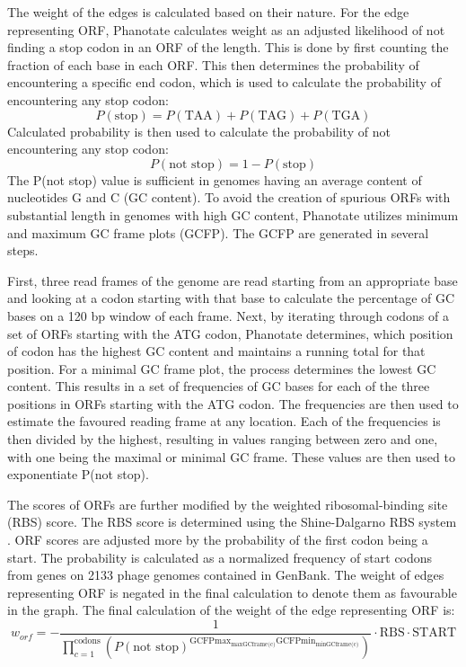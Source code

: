 The weight of the edges is calculated based on their nature. For the edge representing ORF, Phanotate calculates weight as an adjusted likelihood of not finding a stop codon in an ORF of the length. This is done by first counting the fraction of each base in each ORF. This then determines the probability of encountering a specific end codon, which is used to calculate the probability of encountering any stop codon:
\[ P(\text{stop}) = P(\text{TAA}) + P(\text{TAG}) + P(\text{TGA}) \]
Calculated probability is then used to calculate the probability of not encountering any stop codon:
\[ P(\text{not stop}) = 1 - P(\text{stop}) \]
The P(not stop) value is sufficient in genomes having an average content of nucleotides G and C (GC content). To avoid the creation of spurious ORFs with substantial length in genomes with high GC content, Phanotate utilizes minimum and maximum GC frame plots (GCFP). The GCFP are generated in several steps. 

First, three read frames of the genome are read starting from an appropriate base and looking at a codon starting with that base to calculate the percentage of GC bases on a 120 bp window of each frame. Next, by iterating through codons of a set of ORFs starting with the ATG codon, Phanotate determines, which position of codon has the highest GC content and maintains a running total for that position. For a minimal GC frame plot, the process determines the lowest GC content. This results in a set of frequencies of GC bases for each of the three positions in ORFs starting with the ATG codon. The frequencies are then used to estimate the favoured reading frame at any location. Each of the frequencies is then divided by the highest, resulting in values ranging between zero and one, with one being the maximal or minimal GC frame. These values are then used to exponentiate P(not stop).

The scores of ORFs are further modified by the weighted ribosomal-binding site (RBS) score. The RBS score is determined using the Shine-Dalgarno RBS system \cite{hyatt2010prodigal}. ORF scores are adjusted more by the probability of the first codon being a start. The probability is calculated as a normalized frequency of start codons from genes on 2133 phage genomes contained in GenBank. The weight of edges representing ORF is negated in the final calculation to denote them as favourable in the graph. The final calculation of the weight of the edge representing ORF is:
\[ w_{orf} = - \frac{1}{\prod\limits_{c=1}^{\text{codons}}(P(\text{not stop})^{\text{GCFPmax}_{\text{maxGCframe(c)}} \text{GCFPmin}_{\text{minGCframe(c)}}})} \cdot \text{RBS} \cdot \text{START} \]

